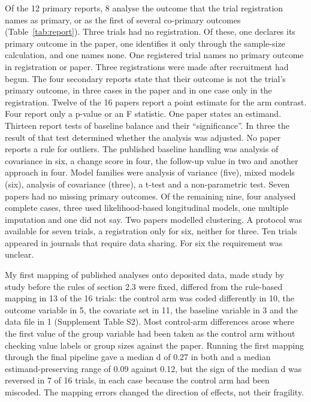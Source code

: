 Of the 12 primary reports, 8 analyse the outcome that the trial registration names as primary, or as the first of several co-primary outcomes (Table~\ref{tab:report}). Three trials had no registration. Of these, one declares its primary outcome in the paper, one identifies it only through the sample-size calculation, and one names none. One registered trial names no primary outcome in registration or paper. Three registrations were made after recruitment had begun. The four secondary reports state that their outcome is not the trial's primary outcome, in three cases in the paper and in one case only in the registration. Twelve of the 16 papers report a point estimate for the arm contrast. Four report only a p-value or an F statistic. One paper states an estimand. Thirteen report tests of baseline balance and their ``significance''. In three the result of that test determined whether the analysis was adjusted. No paper reports a rule for outliers. The published baseline handling was analysis of covariance in six, a change score in four, the follow-up value in two and another approach in four. Model families were analysis of variance (five), mixed models (six), analysis of covariance (three), a t-test and a non-parametric test. Seven papers had no missing primary outcomes. Of the remaining nine, four analysed complete cases, three used likelihood-based longitudinal models, one multiple imputation and one did not say. Two papers modelled clustering. A protocol was available for seven trials, a registration only for six, neither for three. Ten trials appeared in journals that require data sharing. For six the requirement was unclear.

My first mapping of published analyses onto deposited data, made study by study before the rules of section 2.3 were fixed, differed from the rule-based mapping in 13 of the 16 trials: the control arm was coded differently in 10, the outcome variable in 5, the covariate set in 11, the baseline variable in 3 and the data file in 1 (Supplement Table S2). Most control-arm differences arose where the first value of the group variable had been taken as the control arm without checking value labels or group sizes against the paper. Running the first mapping through the final pipeline gave a median \textbar d\textbar{} of 0.27 in both and a median estimand-preserving range of 0.09 against 0.12, but the sign of the median d was reversed in 7 of 16 trials, in each case because the control arm had been miscoded. The mapping errors changed the direction of effects, not their fragility.

